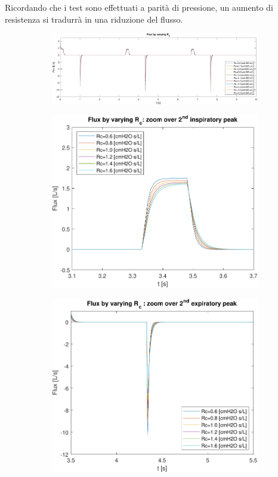 Ricordando che i test sono effettuati a parità di pressione, un aumento di resistenza si tradurrà in una riduzione del flusso. 

\begin{figure}[t!]
\begin{subfigure}{\linewidth}
\centering
\includegraphics[width=0.95\linewidth]{../model/data_log/Rc_flux_total.pdf}
\caption{}
\end{subfigure}\hfill
\begin{subfigure}{0.5\linewidth}
	\centering
	\includegraphics[width=0.95\linewidth]{../model/data_log/Rc_flux_zoom1.pdf}
	\caption{}
\end{subfigure}\hfill
\begin{subfigure}{0.5\linewidth}
	\centering
	\includegraphics[width=0.95\linewidth]{../model/data_log/Rc_flux_zoom2.pdf}

\end{subfigure}
\end{figure}
